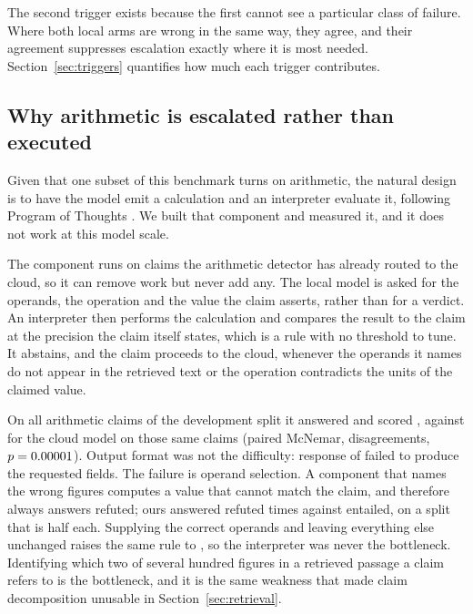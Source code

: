 \documentclass{article}
\begin{document}
The second trigger exists because the first cannot see a particular class of failure. Where
both local arms are wrong in the same way, they agree, and their agreement suppresses
escalation exactly where it is most needed. Section~\ref{sec:triggers} quantifies
how much each trigger contributes.

\subsection{Why arithmetic is escalated rather than executed}
\label{sec:sandbox}

Given that one subset of this benchmark turns on arithmetic, the natural design is to have
the model emit a calculation and an interpreter evaluate it, following Program of Thoughts
\citep{chen2022pot}. We built that component and measured it, and it does not work at this
model scale.

The component runs on claims the arithmetic detector has already routed to the cloud, so it
can remove work but never add any. The local model is asked for the operands, the operation
and the value the claim asserts, rather than for a verdict. An interpreter then performs the
calculation and compares the result to the claim at the precision the claim itself states,
which is a rule with no threshold to tune. It abstains, and the claim proceeds to the cloud,
whenever the operands it names do not appear in the retrieved text or the operation
contradicts the units of the claimed value.

On all \arithN{} arithmetic claims of the development split it answered \arithAnswered{} and
scored \arithAcc{}, against \arithCloudAcc{} for the cloud model on those same claims
(paired McNemar, \arithDisagree{} disagreements, $p = 0.00001{}$). Output format was not the
difficulty: \arithFormatFail{} response of \arithN{} failed to produce the requested fields.
The failure is operand selection. A component that names the wrong figures computes a value
that cannot match the claim, and therefore always answers refuted; ours answered refuted
\arithSaidRefuted{} times against \arithSaidEntailed{} entailed, on a split that is half
each. Supplying the correct operands and leaving everything else unchanged raises the same
rule to \arithOracle{}, so the interpreter was never the bottleneck. Identifying which two of
several hundred figures in a retrieved passage a claim refers to is the bottleneck, and it is
the same weakness that made claim decomposition unusable in Section~\ref{sec:retrieval}.
\end{document}
